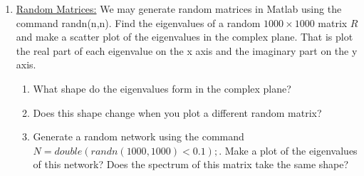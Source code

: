 \documentclass[11pt, a4paper]{article}
\begin{document}
\begin{enumerate}
\item \underline{Random Matrices:} We may generate random matrices in Matlab using the command randn(n,n). Find the eigenvalues of a random $1000 \times 1000$ matrix $R$ and make a scatter plot of the eigenvalues in the complex plane. That is plot the real part of each eigenvalue on the x axis and the imaginary part on the y axis. 
\begin{enumerate}
\item What shape do the eigenvalues form in the complex plane? 
\item Does this shape change when you plot a different random matrix?
\item Generate a random network using the command $N=double(randn(1000,1000)<0.1);$. Make a plot of the eigenvalues of this network? Does the spectrum of this matrix take the same shape?
\end{enumerate}





\end{enumerate}


\end{document}
